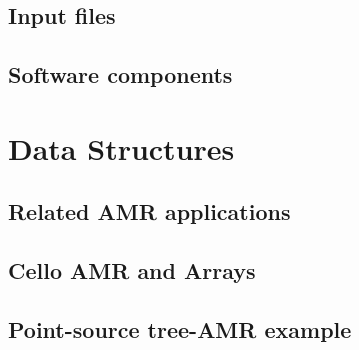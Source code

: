\documentclass{beamer}
\begin{document}
\subsection{Input files}






\subsection{Software components}


% 
% 
% 
% 
% 

\section{Data Structures}

\subsection{Related AMR applications}






\subsection{Cello AMR and Arrays}





\subsection{Point-source tree-AMR example}
\end{document}
